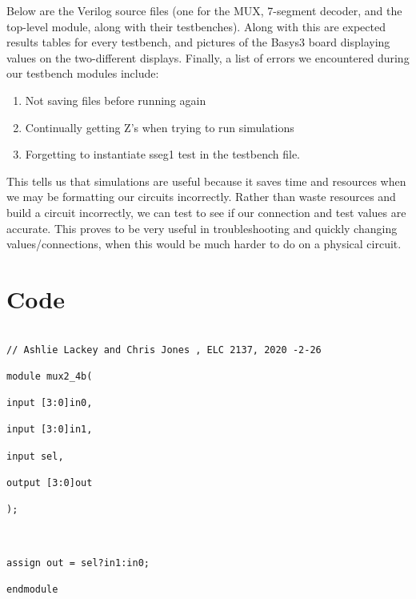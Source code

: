 \documentclass[11pt]{article}
\begin{document}
Below are the Verilog source files (one for the MUX, 7-segment decoder, and the top-level module, along with their testbenches). Along with this are expected results tables for every testbench, and pictures of the Basys3 board displaying values on the two-different displays. Finally, a list of errors we encountered during our testbench modules include:

\begin{enumerate}
	
	\item Not saving files before running again
	
	
	
	\item Continually getting Z's when trying to run simulations
	
	
	
	\item Forgetting to instantiate sseg1 test in the testbench file.
	
	
	
\end{enumerate} 

This tells us that simulations are useful because it saves time and resources when we may be formatting our circuits incorrectly. Rather than waste resources and build a circuit incorrectly, we can test to see if our connection and test values are accurate. This proves to be very useful in troubleshooting and quickly changing values/connections, when this would be much harder to do on a physical circuit.






\section*{Code}

\begin{lstlisting}[style=Verilog,caption=mux2-4b Module Code,label=code:ex ]

// Ashlie Lackey and Chris Jones , ELC 2137, 2020 -2-26

module mux2_4b(

input [3:0]in0,

input [3:0]in1,

input sel,

output [3:0]out 

);



assign out = sel?in1:in0;

endmodule

\end{lstlisting}
\end{document}
